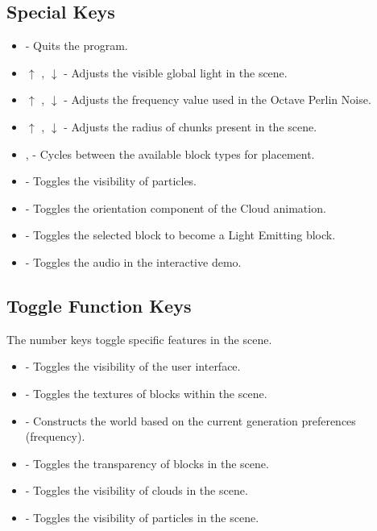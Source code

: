 \documentclass{book}
\begin{document}
\subsection{Special Keys}
\begin{itemize}
	\item {} - Quits the program. 
	\item $\uparrow$ , $\downarrow$  - Adjusts the visible global light in the scene.
	\item $\uparrow$ , $\downarrow$  - Adjusts the frequency value used in the Octave Perlin Noise.
	\item $\uparrow$ , $\downarrow$  - Adjusts the radius of chunks present in the scene.
	\item {},  - Cycles between the available block types for placement.
	\item {} - Toggles the visibility of particles.
	\item {} - Toggles the orientation component of the Cloud animation.
	\item {} - Toggles the selected block to become a Light Emitting block.
	\item {} - Toggles the audio in the interactive demo.
\end{itemize}
      
\subsection{Toggle Function Keys}
The number keys toggle specific features in the scene.
\begin{itemize}
	\item {} - Toggles the visibility of the user interface.
	\item {} - Toggles the textures of blocks within the scene.
	\item {} - Constructs the world based on the current generation preferences (frequency).
	\item {} - Toggles the transparency of blocks in the scene.
	\item {} - Toggles the visibility of clouds in the scene.
	\item {} - Toggles the visibility of particles in the scene.
\end{itemize}

\end{document}
